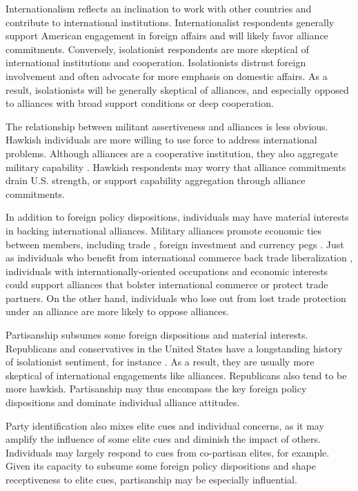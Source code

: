\documentclass[12pt]{article}
\begin{document}
Internationalism reflects an inclination to work with other countries and contribute to international institutions. 
Internationalist respondents generally support American engagement in foreign affairs and will likely favor alliance commitments. 
Conversely, isolationist respondents are more skeptical of international institutions and cooperation. 
Isolationists distrust foreign involvement and often advocate for more emphasis on domestic affairs. 
As a result, isolationists will be generally skeptical of alliances, and especially opposed to alliances with broad support conditions or deep cooperation. 


The relationship between militant assertiveness and alliances is less obvious. 
Hawkish individuals are more willing to use force to address international problems. 
Although alliances are a cooperative institution, they also aggregate military capability \citep{FordhamPoast2014}. 
Hawkish respondents may worry that alliance commitments drain U.S. strength, or support capability aggregation through alliance commitments. 


In addition to foreign policy dispositions, individuals may have material interests in backing international alliances.
Military alliances promote economic ties between members, including trade \citep{Gowa1995, LongLeeds2006}, foreign investment \citep{LiVashchilko2010} and currency pegs \citep{Li2003}. 
Just as individuals who benefit from international commerce back trade liberalization \citep{RhoTomz2017}, individuals with internationally-oriented occupations and economic interests could support alliances that bolster international commerce or protect trade partners. 
On the other hand, individuals who lose out from lost trade protection under an alliance \citep{WolfordKim2017} are more likely to oppose alliances.


Partisanship subsumes some foreign dispositions and material interests. 
Republicans and conservatives in the United States have a longstanding history of isolationist sentiment, for instance \citep{Kupchan2020}.
As a result, they are usually more skeptical of international engagements like alliances. 
Republicans also tend to be more hawkish. 
Partisanship may thus encompass the key foreign policy dispositions and dominate individual alliance attitudes. 


Party identification also mixes elite cues and individual concerns, as it may amplify the influence of some elite cues and diminish the impact of others.
Individuals may largely respond to cues from co-partisan elites, for example. 
Given its capacity to subsume some foreign policy dispositions and shape receptiveness to elite cues, partisanship may be especially influential. 
\end{document}
